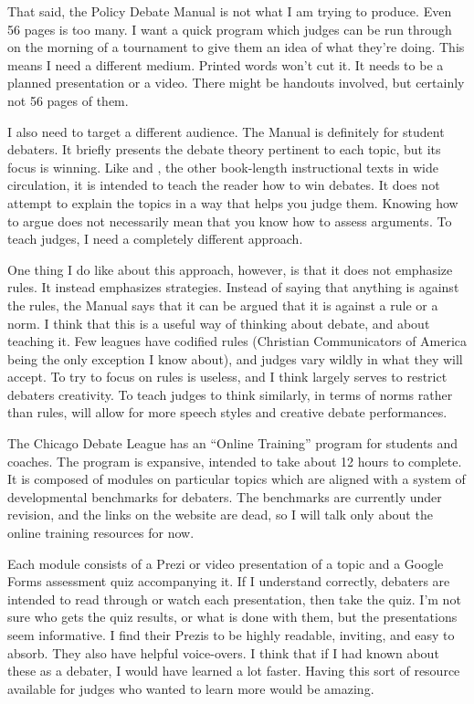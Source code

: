 \documentclass[man,12pt]{apa6}
\begin{document}
That said, the Policy Debate Manual is not what I am trying to produce. Even 56
pages is too many. I want a quick program which judges can be run through on
the morning of a tournament to give them an idea of what they're doing. This
means I need a different medium. Printed words won't cut it. It needs to be a
planned presentation or a video. There might be handouts involved, but
certainly not 56 pages of them.

I also need to target a different audience. The Manual is definitely for
student debaters. It briefly presents the debate theory pertinent to each
topic, but its focus is winning. Like \citet{Bruschke95} and
\citet{Snowball94}, the other book-length instructional texts in wide
circulation, it is intended to teach the reader how to win debates. It does not
attempt to explain the topics in a way that helps you judge them. Knowing how
to argue does not necessarily mean that you know how to assess arguments. To
teach judges, I need a completely different approach.

One thing I do like about this approach, however, is that it does not emphasize
rules. It instead emphasizes strategies. Instead of saying that anything is
against the rules, the Manual says that it can be argued that it is against a
rule or a norm. 
I think that this is a useful way of thinking about debate, and about teaching
it. Few leagues have codified rules (Christian Communicators of America being
the only exception I know about), and judges vary wildly in what they will
accept. To try to focus on rules is useless, and I think largely serves to
restrict debaters creativity. To teach judges to think similarly, in terms of
norms rather than rules, will allow for more speech styles and creative debate
performances.


The Chicago Debate League has an ``Online Training'' program for students and
coaches. The program is expansive, intended to take about 12 hours to complete.
It is composed of modules on particular topics which are aligned with a system
of developmental benchmarks for debaters. The benchmarks are currently under
revision, and the links on the website are dead, so I will talk only about the
online training resources for now.

Each module consists of a Prezi or video presentation of a topic and a Google
Forms assessment quiz accompanying it. If I understand correctly, debaters are
intended to read through or watch each presentation, then take the quiz. I'm
not sure who gets the quiz results, or what is done with them, but the
presentations seem informative. I find their Prezis to be highly readable,
inviting, and easy to absorb. They also have helpful voice-overs. I think that
if I had known about these as a debater, I would have learned a lot faster.
Having this sort of resource available for judges who wanted to learn more
would be amazing.
\end{document}
